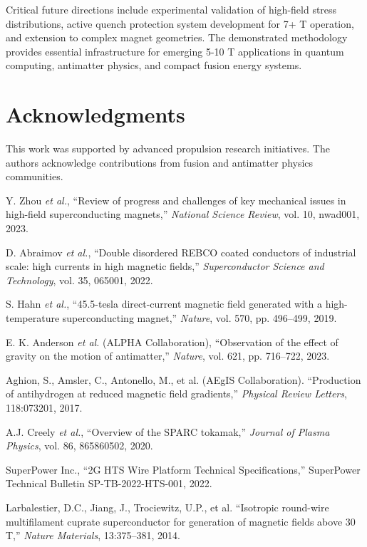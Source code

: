\documentclass[10pt,twocolumn]{article}
\begin{document}
Critical future directions include experimental validation of high-field stress distributions, active quench protection system development for 7+ T operation, and extension to complex magnet geometries. The demonstrated methodology provides essential infrastructure for emerging 5-10 T applications in quantum computing, antimatter physics, and compact fusion energy systems.

\section{Acknowledgments}

This work was supported by advanced propulsion research initiatives. The authors acknowledge contributions from fusion and antimatter physics communities.

\begin{thebibliography}{8}

Y. Zhou \emph{et al.}, ``Review of progress and challenges of key mechanical issues in high-field superconducting magnets,'' \textit{National Science Review}, vol. 10, nwad001, 2023.

D. Abraimov \emph{et al.}, ``Double disordered REBCO coated conductors of industrial scale: high currents in high magnetic fields,'' \textit{Superconductor Science and Technology}, vol. 35, 065001, 2022.

S. Hahn \emph{et al.}, ``45.5-tesla direct-current magnetic field generated with a high-temperature superconducting magnet,'' \textit{Nature}, vol. 570, pp. 496--499, 2019.

E. K. Anderson \emph{et al.} (ALPHA Collaboration), ``Observation of the effect of gravity on the motion of antimatter,'' \textit{Nature}, vol. 621, pp. 716--722, 2023.

Aghion, S., Amsler, C., Antonello, M., et al. (AEgIS Collaboration). ``Production of antihydrogen at reduced magnetic field gradients,'' \textit{Physical Review Letters}, 118:073201, 2017.

A.J. Creely \emph{et al.}, ``Overview of the SPARC tokamak,'' \textit{Journal of Plasma Physics}, vol. 86, 865860502, 2020.

SuperPower Inc., ``2G HTS Wire Platform Technical Specifications,'' SuperPower Technical Bulletin SP-TB-2022-HTS-001, 2022.

Larbalestier, D.C., Jiang, J., Trociewitz, U.P., et al. ``Isotropic round-wire multifilament cuprate superconductor for generation of magnetic fields above 30 T,'' \textit{Nature Materials}, 13:375--381, 2014.


\end{thebibliography}
\end{document}
